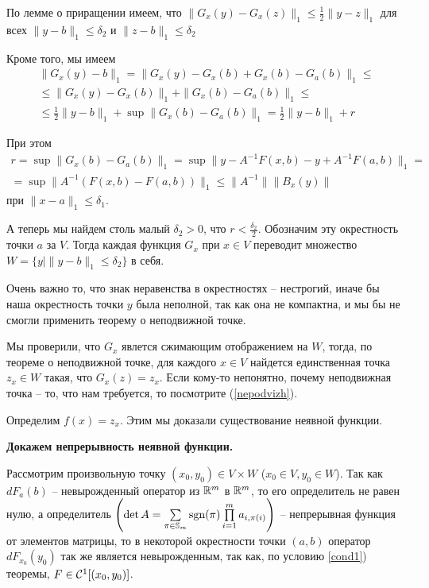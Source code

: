 \begin{Proof}
		По лемме о приращении имеем, что $\|G_x(y)-G_x(z)\|_1\le \frac 1 2 \|y-z\|_1$ для всех $\|y-b\|_1 \le \delta_2$ и $\|z-b\|_1 \le \delta_2$
		
		Кроме того, мы имеем 
		\begin{multline*}
		\|G_x(y) - b\|_1 =  \|G_x(y)  - G_x(b) + G_x(b) - G_a(b)\|_1 \le \\
		\le \|G_x(y)  - G_x(b)\|_1 + \|G_x(b) - G_a(b)\|_1 \le \\ 
		\le \frac 1 2 \|y - b\|_1 + \sup\|G_x(b)-G_a(b)\|_1 = \frac 1 2 \|y - b\|_1 + r
		\end{multline*}
		
		При этом 
		\begin{multline*} r = \sup\|G_x(b)-G_a(b)\|_1 = \sup\| y - A^{-1}F(x,b) - y + A^{-1}F(a,b)\|_1 =\\
		= \sup \|A^{-1}(F(x,b) - F(a,b))\|_1 \le \|A^{-1}\|\|B_x(y)\|
		\end{multline*}
		при $\|x-a\|_1 \le \delta_1$.
		
		А теперь мы найдем столь малый $\delta_2 > 0$, что $r < \frac {\delta_2} 2$. Обозначим эту окрестность точки $a$ за $V$. Тогда каждая функция $G_x$ при $x\in V$  переводит множество $W = \{y \mid \|y-b\|_1 \le \delta_2\}$ в себя.
		
		Очень важно то, что знак неравенства в окрестностях -- нестрогий, иначе бы наша окрестность точки $y$ была неполной, так как она не компактна, и мы бы не смогли применить теорему о неподвижной точке.
		
		Мы проверили, что $G_x$ явлется сжимающим отображением на $W$, тогда, по теореме о неподвижной точке, для каждого $x\in V$ найдется единственная точка $z_x\in W$ такая, что $G_x(z) = z_x$. Если кому-то непонятно, почему неподвижная точка -- то, что нам требуется, то посмотрите (\ref{nepodvizh}).
		
		Определим $f(x) = z_x$. Этим мы доказали существование неявной функции.
		
		\textbf{Докажем непрерывность неявной функции.}
		
		Рассмотрим произвольную точку $(x_0, y_0)\in V\times W$ ($x_0\in V, y_0\in W$). 
		Так как $dF_a(b)$ -- невырожденный оператор из $\mathbb{R}^m$ в $\mathbb{R}^m$, то его определитель не равен нулю, а определитель 
		$\left(\det A = \sum\limits_{\pi \in \mathbb{S}_m}\text{sgn}(\pi)\prod\limits_{i=1}^{m}a_{i, \pi(i)}\right)$ -- непрерывная функция от элементов матрицы, то в некоторой окрестности точки $(a,b)$ оператор $dF_{x_0}(y_0)$ так же является невырожденным, так как, по условию \ref{cond1}) теоремы, $F\in \mathcal{C}^1[(x_0, y_0)]$.
		

\end{Proof}
